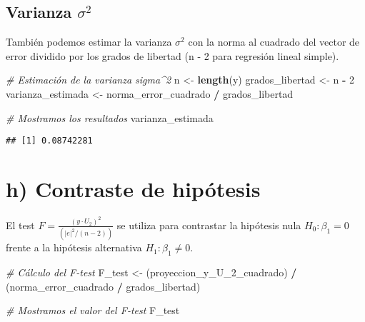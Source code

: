 \documentclass[
]{article}
\newenvironment{Shaded}{\begin{snugshade}}{\end{snugshade}}
\newcommand{\CommentTok}[1]{\textcolor[rgb]{0.56,0.35,0.01}{\textit{#1}}}
\newcommand{\DecValTok}[1]{\textcolor[rgb]{0.00,0.00,0.81}{#1}}
\newcommand{\FunctionTok}[1]{\textcolor[rgb]{0.13,0.29,0.53}{\textbf{#1}}}
\newcommand{\NormalTok}[1]{#1}
\newcommand{\OtherTok}[1]{\textcolor[rgb]{0.56,0.35,0.01}{#1}}
\newcommand{\SpecialCharTok}[1]{\textcolor[rgb]{0.81,0.36,0.00}{\textbf{#1}}}
\begin{document}
\hypertarget{varianza-sigma2}{%
\subsection{\texorpdfstring{Varianza
\(\sigma^2\)}{Varianza \textbackslash sigma\^{}2}}\label{varianza-sigma2}}

También podemos estimar la varianza \(\sigma^2\) con la norma al
cuadrado del vector de error dividido por los grados de libertad (n - 2
para regresión lineal simple).

\begin{Shaded}
\begin{Highlighting}[]
\CommentTok{\# Estimación de la varianza sigma\^{}2}
\NormalTok{n }\OtherTok{\textless{}{-}} \FunctionTok{length}\NormalTok{(y)}
\NormalTok{grados\_libertad }\OtherTok{\textless{}{-}}\NormalTok{ n }\SpecialCharTok{{-}} \DecValTok{2}
\NormalTok{varianza\_estimada }\OtherTok{\textless{}{-}}\NormalTok{ norma\_error\_cuadrado }\SpecialCharTok{/}\NormalTok{ grados\_libertad}

\CommentTok{\# Mostramos los resultados}
\NormalTok{varianza\_estimada}
\end{Highlighting}
\end{Shaded}

\begin{verbatim}
## [1] 0.08742281
\end{verbatim}

\hypertarget{h-contraste-de-hipuxf3tesis}{%
\section{h) Contraste de hipótesis}\label{h-contraste-de-hipuxf3tesis}}

El test \(F = \frac{(y \cdot U_2)^2}{(|e|^2 / (n - 2))}\) se utiliza
para contrastar la hipótesis nula \(H_0: \beta_1 = 0\) frente a la
hipótesis alternativa \(H_1: \beta_1 \neq 0\).

\begin{Shaded}
\begin{Highlighting}[]
\CommentTok{\# Cálculo del F{-}test}
\NormalTok{F\_test }\OtherTok{\textless{}{-}}\NormalTok{ (proyeccion\_y\_U\_2\_cuadrado) }\SpecialCharTok{/}\NormalTok{ (norma\_error\_cuadrado }\SpecialCharTok{/}\NormalTok{ grados\_libertad)}

\CommentTok{\# Mostramos el valor del F{-}test}
\NormalTok{F\_test}
\end{Highlighting}
\end{Shaded}
\end{document}
